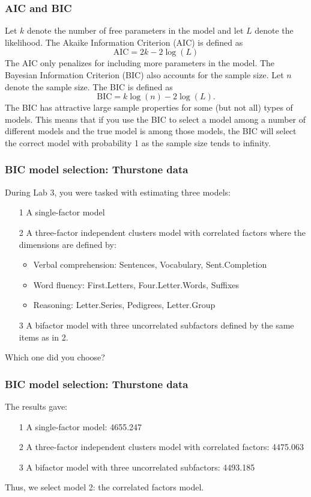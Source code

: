 \documentclass[compress]{beamer}
\begin{document}
\begin{frame}[fragile]
\frametitle{AIC and BIC}
Let $k$ denote the number of free parameters in the model and let $L$ denote the likelihood. The Akaike Information Criterion (AIC) is defined as
\[
\mathrm{AIC} = 2k - 2 \log(L)
\]
The AIC only penalizes for including more parameters in the model. The Bayesian Information Criterion (BIC) also accounts for the sample size. Let $n$ denote the sample size. The BIC is defined as
\[
\mathrm{BIC} = k \log (n) - 2 \log(L).
\]
The BIC has attractive large sample properties for some (but not all) types of models. This means that if you use the BIC to select a model among a number of different models and the true model is among those models, the BIC will select the correct model with probability 1 as the sample size tends to infinity.
\end{frame}

\begin{frame}[fragile]
\frametitle{BIC model selection: Thurstone data}
During Lab 3, you were tasked with estimating three models:
\begin{itemize}
\item[1] A single-factor model
\item[2] A three-factor independent clusters model with correlated factors where the dimensions are defined by:
\begin{itemize}
\item Verbal comprehension: Sentences, Vocabulary, Sent.Completion
\item Word fluency: First.Letters, Four.Letter.Words, Suffixes
\item Reasoning: Letter.Series, Pedigrees, Letter.Group
\end{itemize}
\item[3] A bifactor model with three uncorrelated subfactors defined by the same items as in 2.
\end{itemize}
Which one did you choose?
\end{frame}

\begin{frame}[fragile]
\frametitle{BIC model selection: Thurstone data}
The results gave:
\begin{itemize}
\item[1] A single-factor model: 4655.247 
\item[2] A three-factor independent clusters model with correlated factors: 4475.063
\item[3] A bifactor model with three uncorrelated subfactors: 4493.185
\end{itemize}
Thus, we select model 2: the correlated factors model.
\end{frame}
\end{document}
